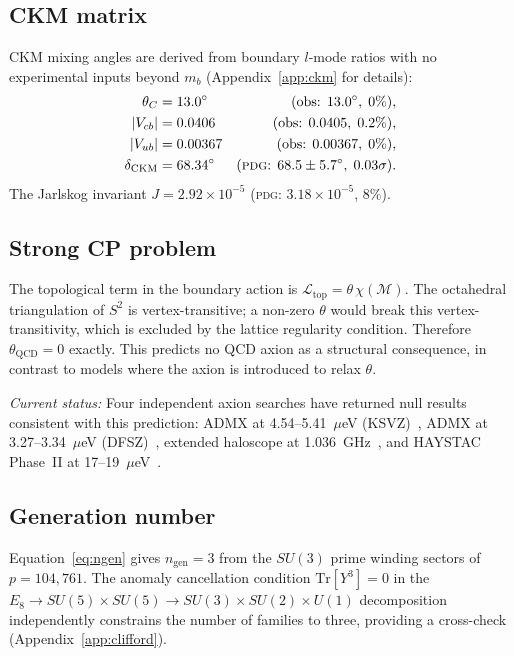 \documentclass[aps,prd,twocolumn,superscriptaddress,longbibliography,nofootinbib]{revtex4-2}
\newcommand{\Stwo}{S^2}
\begin{document}
\subsection{CKM matrix}

CKM mixing angles are derived from boundary $l$-mode ratios with no
experimental inputs beyond $m_b$ (Appendix~\ref{app:ckm} for details):
\begin{align}
\theta_C &= 13.0^\circ &(\text{obs: }13.0^\circ,\; 0\%), \\
|V_{cb}| &= 0.0406 &(\text{obs: }0.0405,\; 0.2\%), \\
|V_{ub}| &= 0.00367 &(\text{obs: }0.00367,\; 0\%), \\
\delta_{\mathrm{CKM}} &= 68.34^\circ &(\text{\textsc{pdg}: }68.5\pm5.7^\circ,\; 0.03\sigma).
\end{align}
The Jarlskog invariant $J = 2.92 \times 10^{-5}$
(\textsc{pdg}: $3.18\times10^{-5}$, $8\%$).

\subsection{Strong CP problem}

The topological term in the boundary action is
$\mathcal{L}_{\mathrm{top}} = \theta\,\chi(\mathcal{M})$.
The octahedral triangulation of $\Stwo$ is vertex-transitive; a non-zero
$\theta$ would break this vertex-transitivity, which is excluded by the
lattice regularity condition.  Therefore $\theta_{\mathrm{QCD}} = 0$ exactly.
This predicts no QCD axion as a structural consequence, in contrast to
models where the axion is introduced to relax $\theta$.

\textit{Current status:} Four independent axion searches have returned null
results consistent with this prediction: ADMX at 4.54--5.41~$\mu$eV
(KSVZ)~\cite{ADMX2025a}, ADMX at 3.27--3.34~$\mu$eV
(DFSZ)~\cite{ADMX2024}, extended haloscope at 1.036~GHz~\cite{Haloscope2026},
and HAYSTAC Phase~II at 17--19~$\mu$eV~\cite{HAYSTAC2024}.

\subsection{Generation number}

Equation~\eqref{eq:ngen} gives $n_{\mathrm{gen}} = 3$ from the $SU(3)$ prime
winding sectors of $p = 104{,}761$.  The anomaly cancellation condition
$\text{Tr}[Y^3] = 0$ in the $E_8 \to SU(5)\times SU(5) \to SU(3)\times SU(2)\times U(1)$
decomposition independently constrains the number of families to three,
providing a cross-check (Appendix~\ref{app:clifford}).
\end{document}
